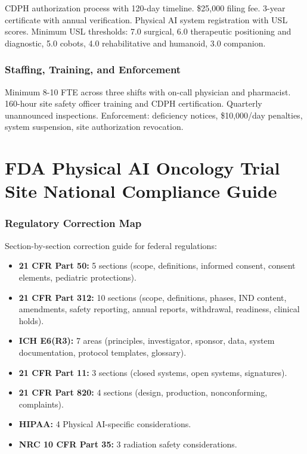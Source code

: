 \documentclass[11pt,letterpaper]{article}
\begin{document}
CDPH authorization process with 120-day timeline. \$25,000 filing fee.
3-year certificate with annual verification. Physical AI system registration
with USL scores. Minimum USL thresholds: 7.0 surgical, 6.0 therapeutic
positioning and diagnostic, 5.0 cobots, 4.0 rehabilitative and humanoid,
3.0 companion.

\section{Staffing, Training, and Enforcement}

Minimum 8-10 FTE across three shifts with on-call physician and pharmacist.
160-hour site safety officer training and CDPH certification. Quarterly
unannounced inspections. Enforcement: deficiency notices, \$10,000/day
penalties, system suspension, site authorization revocation.

\newpage


\part{FDA Physical AI Oncology Trial Site National Compliance Guide}

\section{Regulatory Correction Map}

Section-by-section correction guide for federal regulations:

\begin{itemize}
\item \textbf{21 CFR Part 50:} 5 sections (scope, definitions, informed consent,
  consent elements, pediatric protections).
\item \textbf{21 CFR Part 312:} 10 sections (scope, definitions, phases, IND
  content, amendments, safety reporting, annual reports, withdrawal,
  readiness, clinical holds).
\item \textbf{ICH E6(R3):} 7 areas (principles, investigator, sponsor, data,
  system documentation, protocol templates, glossary).
\item \textbf{21 CFR Part 11:} 3 sections (closed systems, open systems,
  signatures).
\item \textbf{21 CFR Part 820:} 4 sections (design, production, nonconforming,
  complaints).
\item \textbf{HIPAA:} 4 Physical AI-specific considerations.
\item \textbf{NRC 10 CFR Part 35:} 3 radiation safety considerations.
\end{itemize}
\end{document}
